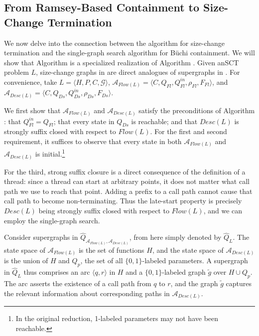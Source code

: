 \documentclass{LMCS}
\newcommand{\zug}[1]{\langle #1  \rangle}
\newcommand{\rzug}[1]{{\scriptstyle\langle} #1  {\scriptstyle\rangle}}
\newcommand\buchi{B\"uchi }
\newcommand{\A}{{\mathcal A}}
\newcommand{\G}{{\mathcal G}}
\renewcommand{\graph}{\widetilde}
\newcommand{\superg}{\widehat}
\newcommand{\supergFD}{\superg{Q}_L}
\begin{document}
\subsection{From Ramsey-Based Containment to Size-Change Termination}\label{Sect:SCT_Is_Ramsey}

We now delve into the connection between the \LJB algorithm for
size-change termination \linebreak[2]and the single-graph search algorithm for \buchi
containment. We will show that \linebreak[2]Algorithm \LJB is a specialized
realization of Algorithm \SGS. Given an\linebreak[2] SCT problem $L$,
size-change graphs in  are direct analogues of supergraphs in
\linebreak[2]\SGS{$\A_{Flow(L)}$, $\A_{Desc(L)}$}. For convenience, take $L=\zug{H, P, C,
\G}$, \linebreak[2]$\A_{Flow(L)}= \zug{C, Q_{Fl}, Q_{Fl}^{in}, \rho_{Fl}, F_{Fl}}$, and
$\A_{Desc(L)} = \zug{C, Q_{Ds}, Q_{Ds}^{in}, \rho_{Ds}, F_{Ds}}$.

We first show that $\A_{Flow(L)}$ and $\A_{Desc(L)}$ satisfy the preconditions 
of Algorithm \linebreak[4]\SGS: that $Q^{in}_{Fl}=Q_{Fl}$; that every state in
$Q_{Ds}$ is reachable; and that $Desc(L)$ is strongly suffix closed with respect
to $Flow(L)$.  For the first and second requirement, it suffices to observe that
every state in both $\A_{Flow(L)}$ and $\A_{Desc(L)}$ is initial.\footnote{In
the original reduction, 1-labeled parameters may not have been reachable.} 

For the third, strong suffix closure is a direct consequence of the definition
of a thread: since a thread can start at arbitrary points, it does not matter
what call path we use to reach that point. Adding a prefix to a call path cannot
cause that call path to become non-terminating. Thus the late-start property is
precisely $Desc(L)$ being strongly suffix closed with respect to $Flow(L)$, and
we can employ the single-graph search. 

Consider supergraphs in $\superg{Q}_{\A_{Flow(L)},\A_{Desc(L)}}$, from here
simply denoted by $\supergFD$.  The state space of $\A_{Flow(L)}$ is the set
of functions $H$, and the state space of $\A_{Desc(L)}$ is the union of $H$ and
$Q_p$, the set of all $\{0,1\}$-labeled parameters.  A supergraph in
$\supergFD$ thus comprises an arc $\rzug{q,r}$ in
$H$ and a $\{0,1\}$-labeled graph $\graph{g}$ over $H \cup Q_p$. The arc asserts
the existence of a call path from $q$ to $r$, and the graph $\graph{g}$ captures
the relevant information about corresponding paths in $\A_{Desc(L)}$. 
\end{document}
